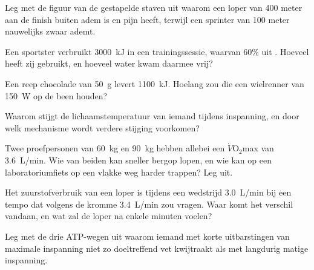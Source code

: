 \begin{exercise}[$\star\star$]\label{exo:g10:exercise-and-energy:8}
Leg met de figuur van de gestapelde staven uit waarom een loper van 400
meter aan de finish buiten adem is en pijn heeft, terwijl een sprinter
van 100 meter nauwelijks zwaar ademt.
\end{exercise}

\begin{exercise}[$\star\star$]\label{exo:g10:exercise-and-energy:9}
Een sportster verbruikt \qty{3000}{kJ} in een trainingssessie, waarvan
60\% uit . Hoeveel  heeft zij gebruikt, en hoeveel
water kwam daarmee vrij?
\end{exercise}

\begin{exercise}[$\star\star$]\label{exo:g10:exercise-and-energy:10}
Een reep chocolade van \qty{50}{g} levert \qty{1100}{kJ}. Hoelang zou
die een wielrenner van \qty{150}{W} op de been houden?
\end{exercise}

\begin{exercise}[$\star\star$]\label{exo:g10:exercise-and-energy:11}
Waarom stijgt de lichaamstemperatuur van iemand tijdens inspanning, en
door welk mechanisme wordt verdere stijging voorkomen?
\end{exercise}

\begin{exercise}[$\star\star\star$]\label{exo:g10:exercise-and-energy:12}
Twee proefpersonen van \qty{60}{kg} en \qty{90}{kg} hebben allebei een
$\dot V\!\mathrm{O_2}$max van \qty{3.6}{L/min}. Wie van beiden kan
sneller bergop lopen, en wie kan op een laboratoriumfiets op een vlakke
weg harder trappen? Leg uit.
\end{exercise}

\begin{exercise}[$\star\star\star$]\label{exo:g10:exercise-and-energy:13}
Het zuurstofverbruik van een loper is tijdens een wedstrijd
\qty{3.0}{L/min} bij een tempo dat volgens de kromme \qty{3.4}{L/min}
zou vragen. Waar komt het verschil vandaan, en wat zal de loper na
enkele minuten voelen?
\end{exercise}

\begin{exercise}[$\star\star\star$]\label{exo:g10:exercise-and-energy:14}
Leg met de drie ATP-wegen uit waarom iemand met korte uitbarstingen van
maximale inspanning niet zo doeltreffend vet kwijtraakt als met langdurig
matige inspanning.
\end{exercise}

